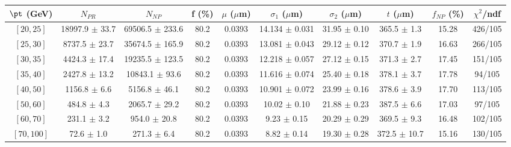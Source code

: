 \begin{tabular}{c||c|c|c|c|c|c|c||c|c}
$\pt$ (GeV) & $N_{PR}$ & $N_{NP}$ & f (\%) & $\mu$ ($\mu$m) & $\sigma_1$ ($\mu$m) & $\sigma_2$ ($\mu$m)  & $t$ ($\mu$m) & $f_{NP}$ (\%) & $\chi^2$/ndf \\
\hline
$[20, 25]$ & 18997.9 $\pm$ 33.7 & 69506.5 $\pm$ 233.6 & 80.2 & 0.0393 & 14.134 $\pm$ 0.031 & 31.95 $\pm$ 0.10 & 365.5 $\pm$ 1.3 & 15.28 & 426/105\\
$[25, 30]$ & 8737.5 $\pm$ 23.7 & 35674.5 $\pm$ 165.9 & 80.2 & 0.0393 & 13.081 $\pm$ 0.043 & 29.12 $\pm$ 0.12 & 370.7 $\pm$ 1.9 & 16.63 & 266/105\\
$[30, 35]$ & 4424.3 $\pm$ 17.4 & 19235.5 $\pm$ 123.5 & 80.2 & 0.0393 & 12.218 $\pm$ 0.057 & 27.12 $\pm$ 0.15 & 371.3 $\pm$ 2.7 & 17.45 & 151/105\\
$[35, 40]$ & 2427.8 $\pm$ 13.2 & 10843.1 $\pm$ 93.6 & 80.2 & 0.0393 & 11.616 $\pm$ 0.074 & 25.40 $\pm$ 0.18 & 378.1 $\pm$ 3.7 & 17.78 & 94/105\\
$[40, 50]$ & 1156.8 $\pm$ 6.6 & 5156.8 $\pm$ 46.1 & 80.2 & 0.0393 & 10.901 $\pm$ 0.072 & 23.99 $\pm$ 0.16 & 378.6 $\pm$ 3.9 & 17.70 & 113/105\\
$[50, 60]$ & 484.8 $\pm$ 4.3 & 2065.7 $\pm$ 29.2 & 80.2 & 0.0393 & 10.02 $\pm$ 0.10 & 21.88 $\pm$ 0.23 & 387.5 $\pm$ 6.6 & 17.03 & 97/105\\
$[60, 70]$ & 231.1 $\pm$ 3.2 & 954.0 $\pm$ 20.8 & 80.2 & 0.0393 & 9.23 $\pm$ 0.15 & 20.29 $\pm$ 0.29 & 369.5 $\pm$ 9.3 & 16.48 & 102/105\\
$[70, 100]$ & 72.6 $\pm$ 1.0 & 271.3 $\pm$ 6.4 & 80.2 & 0.0393 & 8.82 $\pm$ 0.14 & 19.30 $\pm$ 0.28 & 372.5 $\pm$ 10.7 & 15.16 & 130/105\\
\end{tabular}
